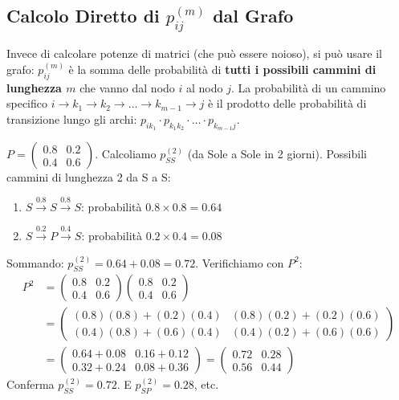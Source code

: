 \subsection{Calcolo Diretto di $p_{ij}^{(m)}$ dal Grafo}
Invece di calcolare potenze di matrici (che può essere noioso), si può usare il grafo:
$p_{ij}^{(m)}$ è la somma delle probabilità di \textbf{tutti i possibili cammini di lunghezza $m$} che vanno dal nodo $i$ al nodo $j$.
La probabilità di un cammino specifico $i \to k_1 \to k_2 \to \dots \to k_{m-1} \to j$ è il prodotto delle probabilità di transizione lungo gli archi: $p_{ik_1} \cdot p_{k_1k_2} \cdot \dots \cdot p_{k_{m-1}j}$.

\begin{example}
$P = \begin{pmatrix} 0.8 & 0.2 \\ 0.4 & 0.6 \end{pmatrix}$.
Calcoliamo $p_{SS}^{(2)}$ (da Sole a Sole in 2 giorni).
Possibili cammini di lunghezza 2 da S a S:
\begin{enumerate}
    \item $S \xrightarrow{0.8} S \xrightarrow{0.8} S$: probabilità $0.8 \times 0.8 = 0.64$
    \item $S \xrightarrow{0.2} P \xrightarrow{0.4} S$: probabilità $0.2 \times 0.4 = 0.08$
\end{enumerate}
Sommando: $p_{SS}^{(2)} = 0.64 + 0.08 = 0.72$.
Verifichiamo con $P^2$:
\begin{align*}
P^2 &= \begin{pmatrix} 0.8 & 0.2 \\ 0.4 & 0.6 \end{pmatrix} \begin{pmatrix} 0.8 & 0.2 \\ 0.4 & 0.6 \end{pmatrix} \\
&= \begin{pmatrix}
(0.8)(0.8)+(0.2)(0.4) & (0.8)(0.2)+(0.2)(0.6) \\
(0.4)(0.8)+(0.6)(0.4) & (0.4)(0.2)+(0.6)(0.6)
\end{pmatrix} \\
&= \begin{pmatrix}
0.64+0.08 & 0.16+0.12 \\
0.32+0.24 & 0.08+0.36
\end{pmatrix} = \begin{pmatrix}
0.72 & 0.28 \\
0.56 & 0.44
\end{pmatrix}
\end{align*}
Conferma $p_{SS}^{(2)} = 0.72$. E $p_{SP}^{(2)} = 0.28$, etc.
\end{example}

